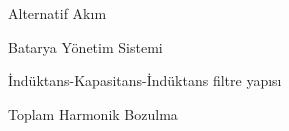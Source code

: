 \begingroup
\singlespacing
\begin{description}[leftmargin=32mm,labelwidth=27mm,itemsep=6pt]
  \item[AA] Alternatif Akım
  \item[BYS] Batarya Yönetim Sistemi
  \item[LCL] İndüktans-Kapasitans-İndüktans filtre yapısı
  \item[THD] Toplam Harmonik Bozulma
\end{description}
\endgroup
